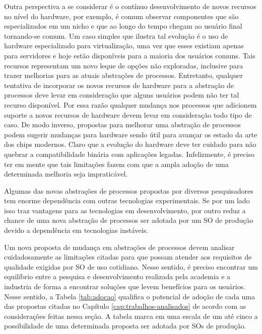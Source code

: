 Outra perspectiva a se considerar é o contínuo desenvolvimento de novos
recursos no nível do hardware, por exemplo, é comum observar componentes que
são especializados em um nicho e que ao longo do tempo chegam ao usuário
final tornando-se comum. Um caso simples que ilustra tal evolução é o
uso de hardware especializado para virtualização, uma vez que esses existiam
apenas para servidores e hoje estão disponíveis para a maioria dos usuários
comuns. Tais recursos representam um novo leque de opções não exploradas,
inclusive para trazer melhorias para as atuais abstrações de processos.
Entretanto, qualquer tentativa de incorporar os novos recursos de hardware para
a abstração de processos deve levar em consideração que alguns usuários podem
não ter tal recurso disponível. Por essa razão qualquer mudança nos processos
que adicionem suporte a novos recursos de hardware devem levar em consideração
todo tipo de caso. De modo inverso, propostas para melhorar uma abstração de
processos podem sugerir mudanças para hardware sendo útil para avançar os
estado da arte dos chips modernos. Claro que a evolução do hardware deve ter
cuidado para não quebrar a compatibilidade binária com aplicações legadas.
Infelizmente, é preciso ter em mente que tais limitações fazem com que a ampla
adoção de uma determinada melhoria seja impraticável.

Algumas das novas abstrações de processos propostas por diversos pesquisadores
tem enorme dependência com outras tecnologias experimentais. Se por um lado
isso traz vantagens para as tecnologias em desenvolvimento, por outro reduz a
chance de uma nova abstração de processos ser adotada por um SO de produção
devido a dependência em tecnologias instáveis.

Um nova proposta de mudança em abstrações de processos devem analisar
cuidadosamente as limitações citadas para que possam atender aos requisitos de
qualidade exigidas por SO de uso cotidiano. Nesse sentido, é preciso encontrar
um equilíbrio entre a pesquisa e desenvolvimento realizada pela academia e a
industria de forma a encontrar soluções que levem benefícios para os usuários.
Nesse sentido, a Tabela \ref{tab:adocao} qualifica o potencial de adoção de
cada uma das propostas citadas no Capítulo \ref{cap:trabalhos-analisados} de
acordo com as considerações feitas nessa seção. A tabela marca em uma escala de
um até cinco a possibilidade de uma determinada proposta ser adotada por SOs de
produção.



